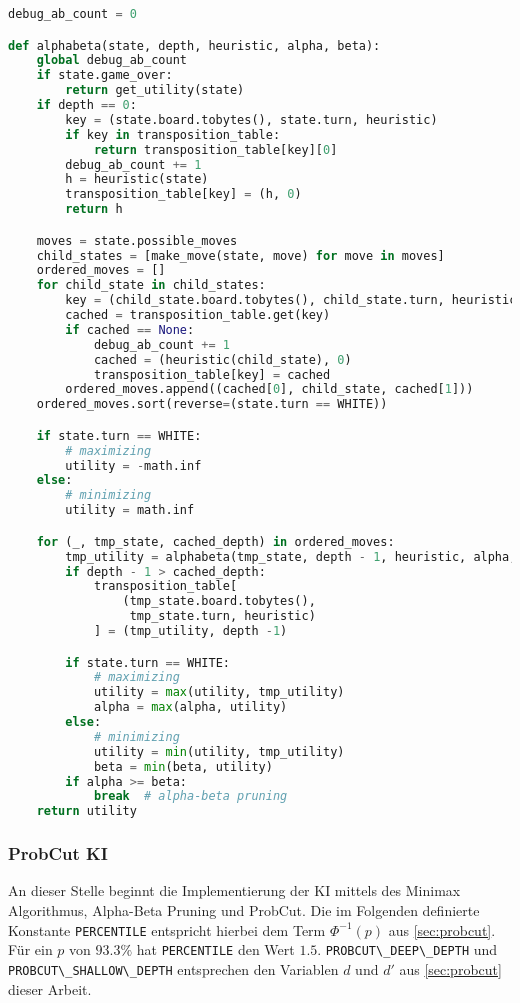 \begin{lstlisting}[language=Python]
debug_ab_count = 0

def alphabeta(state, depth, heuristic, alpha, beta):
    global debug_ab_count
    if state.game_over:
        return get_utility(state)
    if depth == 0:
        key = (state.board.tobytes(), state.turn, heuristic)
        if key in transposition_table:
            return transposition_table[key][0]
        debug_ab_count += 1
        h = heuristic(state)
        transposition_table[key] = (h, 0)
        return h

    moves = state.possible_moves
    child_states = [make_move(state, move) for move in moves]
    ordered_moves = []
    for child_state in child_states:
        key = (child_state.board.tobytes(), child_state.turn, heuristic)
        cached = transposition_table.get(key)
        if cached == None:
            debug_ab_count += 1
            cached = (heuristic(child_state), 0)
            transposition_table[key] = cached
        ordered_moves.append((cached[0], child_state, cached[1]))
    ordered_moves.sort(reverse=(state.turn == WHITE))

    if state.turn == WHITE:
        # maximizing
        utility = -math.inf
    else:
        # minimizing
        utility = math.inf

    for (_, tmp_state, cached_depth) in ordered_moves:
        tmp_utility = alphabeta(tmp_state, depth - 1, heuristic, alpha, beta)
        if depth - 1 > cached_depth:
            transposition_table[
                (tmp_state.board.tobytes(),
                 tmp_state.turn, heuristic)
            ] = (tmp_utility, depth -1)

        if state.turn == WHITE:
            # maximizing
            utility = max(utility, tmp_utility)
            alpha = max(alpha, utility)
        else:
            # minimizing
            utility = min(utility, tmp_utility)
            beta = min(beta, utility)
        if alpha >= beta:
            break  # alpha-beta pruning
    return utility
\end{lstlisting}

\hypertarget{probcut-ki}{%
\subsubsection{ProbCut KI}\label{probcut-ki}}

An dieser Stelle beginnt die Implementierung der \ac{KI} mittels des
Minimax Algorithmus, Alpha-Beta Pruning und ProbCut. Die im Folgenden
definierte Konstante \passthrough{\lstinline!PERCENTILE!} entspricht
hierbei dem Term \(\Phi^{-1}(p)\) aus \autoref{sec:probcut}. Für ein
\(p\) von \(93.3\%\) hat \passthrough{\lstinline!PERCENTILE!} den Wert
\(1.5\). \passthrough{\lstinline!PROBCUT\_DEEP\_DEPTH!} und
\passthrough{\lstinline!PROBCUT\_SHALLOW\_DEPTH!} entsprechen den
Variablen \(d\) und \(d'\) aus \autoref{sec:probcut} dieser Arbeit.

